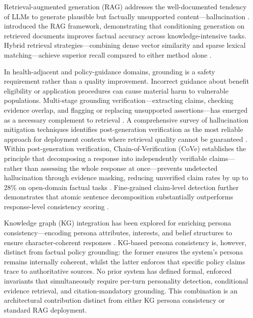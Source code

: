 \documentclass[10pt,a4paper]{report}
\begin{document}
Retrieval-augmented generation (RAG) addresses the well-documented tendency of LLMs to generate plausible but factually unsupported content---hallucination \citep{Ji2023}. \citet{Lewis2020} introduced the RAG framework, demonstrating that conditioning generation on retrieved documents improves factual accuracy across knowledge-intensive tasks. Hybrid retrieval strategies---combining dense vector similarity and sparse lexical matching---achieve superior recall compared to either method alone \citep{Karpukhin2020, Ma2023}.

In health-adjacent and policy-guidance domains, grounding is a safety requirement rather than a quality improvement. Incorrect guidance about benefit eligibility or application procedures can cause material harm to vulnerable populations. Multi-stage grounding verification---extracting claims, checking evidence overlap, and flagging or replacing unsupported assertions---has emerged as a necessary complement to retrieval \citep{Thoppilan2022, Gao2023, Singhal2023}. A comprehensive survey of hallucination mitigation techniques identifies post-generation verification as the most reliable approach for deployment contexts where retrieval quality cannot be guaranteed \citep{Tonmoy2024}. Within post-generation verification, Chain-of-Verification (CoVe) establishes the principle that decomposing a response into independently verifiable claims---rather than assessing the whole response at once---prevents undetected hallucination through evidence masking, reducing unverified claim rates by up to 28\% on open-domain factual tasks \citep{Dhuliawala2023}. Fine-grained claim-level detection further demonstrates that atomic sentence decomposition substantially outperforms response-level consistency scoring \citep{Mishra2024}.

Knowledge graph (KG) integration has been explored for enriching persona consistency---encoding persona attributes, interests, and belief structures to ensure character-coherent responses \citep{Majumder2020}. KG-based persona consistency is, however, distinct from factual policy grounding: the former ensures the system's persona remains internally coherent, whilst the latter enforces that specific policy claims trace to authoritative sources. No prior system has defined formal, enforced invariants that simultaneously require per-turn personality detection, conditional evidence retrieval, and citation-mandatory grounding. This combination is an architectural contribution distinct from either KG persona consistency or standard RAG deployment.
\end{document}

